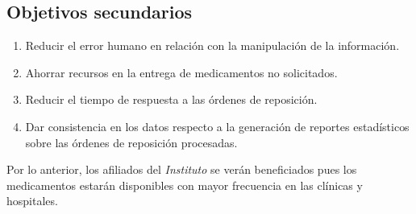 \subsection{Objetivos secundarios}\label{sec:objetivos-secundarios}
\begin{enumerate}
\item Reducir el error humano en relación con la manipulación de la información.
\item Ahorrar recursos en la entrega de medicamentos no solicitados.
\item Reducir el tiempo de respuesta a las órdenes de reposición.
\item Dar consistencia en los datos respecto a la generación de reportes estadísticos sobre las órdenes de reposición procesadas.
\end{enumerate}
Por lo anterior, los afiliados del \textit{Instituto} se verán beneficiados pues los medicamentos estarán disponibles con mayor frecuencia en las clínicas y hospitales.
